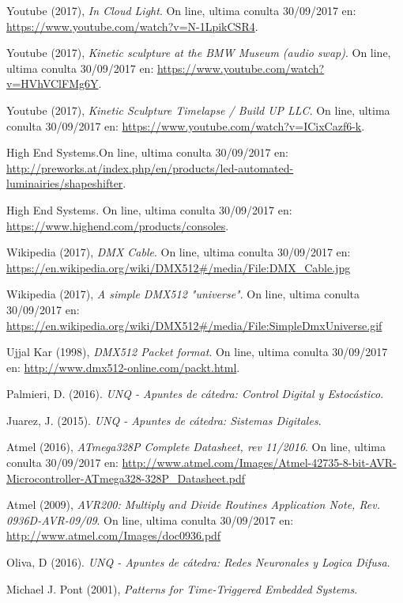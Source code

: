 \begin{thebibliography}{9}
	 Youtube (2017), \textit{In Cloud Light}. On line, ultima conulta 30/09/2017 en: \url{https://www.youtube.com/watch?v=N-1LpikCSR4}.
	
	 Youtube (2017), \textit{Kinetic sculpture at the BMW Museum (audio swap)}. On line, ultima conulta 30/09/2017 en: \url{https://www.youtube.com/watch?v=HVhVClFMg6Y}. 
	
	 Youtube (2017), \textit{Kinetic Sculpture Timelapse / Build UP LLC}. On line, ultima conulta 30/09/2017 en: \url{https://www.youtube.com/watch?v=ICixCazf6-k}.
	
	 High End Systems.On line, ultima conulta 30/09/2017 en: \url{http://preworks.at/index.php/en/products/led-automated-luminairies/shapeshifter}.
	
	 High End Systems. On line, ultima conulta 30/09/2017 en: \url{https://www.highend.com/products/consoles}.
	
	 Wikipedia (2017), \textit{DMX Cable}. On line, ultima conulta 30/09/2017 en: \url{https://en.wikipedia.org/wiki/DMX512#/media/File:DMX_Cable.jpg}
	
	 Wikipedia (2017), \textit{A simple DMX512 "universe"}. On line, ultima conulta 30/09/2017 en: \url{https://en.wikipedia.org/wiki/DMX512#/media/File:SimpleDmxUniverse.gif}
	
	 Ujjal Kar (1998), \textit{DMX512 Packet format}. On line, ultima conulta 30/09/2017 en: \url{http://www.dmx512-online.com/packt.html}.
	
	 Palmieri, D. (2016). \textit{UNQ - Apuntes de cátedra: Control Digital y Estocástico}.
	
	 Juarez, J. (2015). \textit{UNQ - Apuntes de cátedra: Sistemas Digitales}.
	
	 Atmel (2016), \textit{ATmega328P Complete Datasheet, rev 11/2016}. On line, ultima conulta 30/09/2017 en: \url{http://www.atmel.com/Images/Atmel-42735-8-bit-AVR-Microcontroller-ATmega328-328P_Datasheet.pdf}
	
	 Atmel (2009), \textit{AVR200: Multiply and Divide Routines Application Note, Rev. 0936D-AVR-09/09}. On line, ultima conulta 30/09/2017 en: \href{http://www.atmel.com/Images/doc0936.pdf}{http://www.atmel.com/Images/doc0936.pdf}
	
	 Oliva, D (2016). \textit{UNQ - Apuntes de cátedra: Redes Neuronales y Logica Difusa}.
	
	 Michael J. Pont (2001), \textit{Patterns for Time-Triggered Embedded Systems}. 
	
	
	
\end{thebibliography}